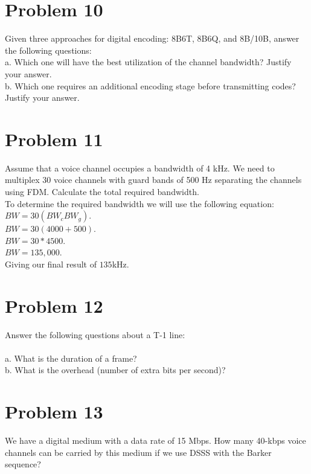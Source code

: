 \documentclass{article}
\begin{document}
\section*{Problem 10}
Given three approaches for digital encoding: 8B6T, 8B6Q, and 8B/10B, answer the
following questions:\\
\subP a. Which one will have the best utilization of the channel bandwidth? Justify your answer.\\
\subP b. Which one requires an additional encoding stage before transmitting codes? Justify your
answer.\\

\section*{Problem 11} %
Assume that a voice channel occupies a bandwidth of 4 kHz. We need to multiplex 30 voice
channels with guard bands of 500 Hz separating the channels using FDM. Calculate the total
required bandwidth.\\
To determine the required bandwidth we will use the following equation:\\
$BW = 30(BW_{c} BW_{g})$.\\
$BW = 30(4000 + 500)$.\\
$BW = 30 * 4500$.\\
$BW = 135,000$.\\
Giving our final result of $135$kHz.\\

\section*{Problem 12}
Answer the following questions about a T-1 line:\\\\
\subP a. What is the duration of a frame?\\
\subP b. What is the overhead (number of extra bits per second)?\\

\section*{Problem 13}
We have a digital medium with a data rate of 15 Mbps. How many 40-kbps voice channels can be
carried by this medium if we use DSSS with the Barker sequence?\\\\
\end{document}

